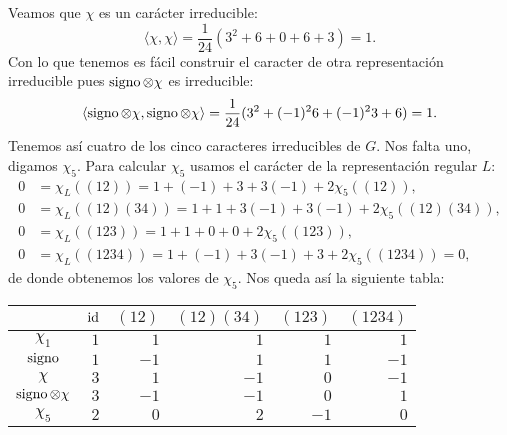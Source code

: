 \begin{example}
	Veamos que $\chi$ es un carácter irreducible: 
	\[
		\langle \chi,\chi\rangle=\frac{1}{24}(3^2+6+0+6+3)=1.
	\]
	Con lo que tenemos es fácil construir el caracter de otra representación irreducible pues
	$\operatorname{signo}\otimes\chi$ es irreducible:
	\[
		\langle \operatorname{signo}\otimes\chi,\operatorname{signo}\otimes\chi\rangle=\frac{1}{24}(3^2+(-1)^26+(-1)^23+6)=1.
	\]
	Tenemos así cuatro de los cinco caracteres irreducibles de $G$. Nos falta
	uno, digamos $\chi_5$.  Para calcular $\chi_5$ usamos el carácter de la
	representación regular $L$:
	\begin{align*}
		0 &= \chi_L\left( (12) \right)=1+(-1)+3+3(-1)+2\chi_5\left( (12) \right),\\
		0 &= \chi_L\left( (12)(34) \right)=1+1+3(-1)+3(-1)+2\chi_5\left( (12)(34) \right),\\
		0 &= \chi_L\left( (123) \right)=1+1+0+0+2\chi_5\left( (123) \right),\\
		0 &= \chi_L\left( (1234) \right)=1+(-1)+3(-1)+3+2\chi_5\left( (1234) \right)=0,
	\end{align*}
	de donde obtenemos los valores de $\chi_5$. Nos queda así la siguiente tabla:
	\begin{center}
		\begin{tabular}{|c|rrrrr|}
			\hline
			& $\operatorname{id}$ & $(12)$ & $(12)(34)$ & $(123)$ & $(1234)$\tabularnewline
			\hline
			$\chi_1$ & $1$ & $1$ & $1$ & $1$ & $1$\tabularnewline
			$\operatorname{signo}$ & $1$ & $-1$ & $1$ & $1$ & $-1$\tabularnewline
			$\chi$ & $3$ & $1$ & $-1$ & $0$ & $-1$\tabularnewline
			$\operatorname{signo}\otimes\chi$ & $3$ & $-1$ & $-1$ & $0$ & $1$\tabularnewline
			$\chi_5$ & $2$ & $0$ & $2$ & $-1$ & $0$\tabularnewline
			\hline
		\end{tabular}
	\end{center}
\end{example}

